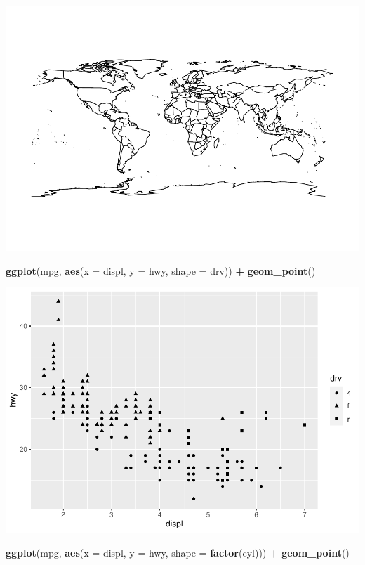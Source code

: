 \documentclass[
]{book}
\newenvironment{Shaded}{\begin{snugshade}}{\end{snugshade}}
\newcommand{\DataTypeTok}[1]{\textcolor[rgb]{0.13,0.29,0.53}{#1}}
\newcommand{\KeywordTok}[1]{\textcolor[rgb]{0.13,0.29,0.53}{\textbf{#1}}}
\newcommand{\NormalTok}[1]{#1}
\newcommand{\OperatorTok}[1]{\textcolor[rgb]{0.81,0.36,0.00}{\textbf{#1}}}
\newcommand{\StringTok}[1]{\textcolor[rgb]{0.31,0.60,0.02}{#1}}
\begin{document}
\includegraphics{_main_files/figure-latex/unnamed-chunk-255-1.pdf}

\begin{Shaded}
\begin{Highlighting}[]
\KeywordTok{ggplot}\NormalTok{(mpg, }\KeywordTok{aes}\NormalTok{(}\DataTypeTok{x =}\NormalTok{ displ, }\DataTypeTok{y =}\NormalTok{ hwy, }\DataTypeTok{shape =}\NormalTok{ drv)) }\OperatorTok{+}\StringTok{ }\KeywordTok{geom_point}\NormalTok{()}
\end{Highlighting}
\end{Shaded}

\includegraphics{_main_files/figure-latex/unnamed-chunk-255-2.pdf}

\begin{Shaded}
\begin{Highlighting}[]
\KeywordTok{ggplot}\NormalTok{(mpg, }\KeywordTok{aes}\NormalTok{(}\DataTypeTok{x =}\NormalTok{ displ, }\DataTypeTok{y =}\NormalTok{ hwy, }\DataTypeTok{shape =} \KeywordTok{factor}\NormalTok{(cyl))) }\OperatorTok{+}\StringTok{ }\KeywordTok{geom_point}\NormalTok{()}
\end{Highlighting}
\end{Shaded}
\end{document}
